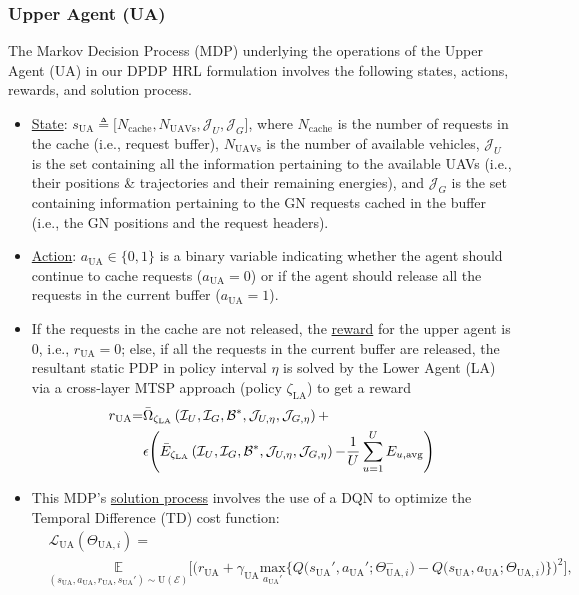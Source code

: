 \documentclass{article}
\begin{document}
\subsubsection{Upper Agent (UA)}
The Markov Decision Process (MDP) underlying the operations of the Upper Agent (UA) in our DPDP HRL formulation involves the following states, actions, rewards, and solution process.
\begin{itemize}
    \item \underline{State}: $s_{\mathrm{UA}}{\triangleq}\Big[N_{\mathrm{cache}},N_{\mathrm{UAVs}},\mathcal{J}_{U},\mathcal{J}_{G}\Big]$, where $N_{\mathrm{cache}}$ is the number of requests in the cache (i.e., request buffer), $N_{\mathrm{UAVs}}$ is the number of available vehicles, $\mathcal{J}_{U}$ is the set containing all the information pertaining to the available UAVs (i.e., their positions \& trajectories and their remaining energies), and $\mathcal{J}_{G}$ is the set containing information pertaining to the GN requests cached in the buffer (i.e., the GN positions and the request headers).
    \item \underline{Action}: $a_{\mathrm{UA}}{\in}\{0,1\}$ is a binary variable indicating whether the agent should continue to cache requests ($a_{\mathrm{UA}}{=}0$) or if the agent should release all the requests in the current buffer ($a_{\mathrm{UA}}{=}1$).
    \item If the requests in the cache are not released, the \underline{reward} for the upper agent is $0$, i.e., $r_{\mathrm{UA}}{=}0$; else, if all the requests in the current buffer are released, the resultant static PDP in policy interval $\eta$ is solved by the Lower Agent (LA) via a cross-layer MTSP approach (policy $\zeta_{\mathrm{LA}}$) to get a reward
    \begin{align}\label{Reward_lower_agent}
        r_{\mathrm{UA}}{=}&\Bar{\Omega}_{\zeta_{\mathrm{LA}}}\left(\mathcal{I}_{U},\mathcal{I}_{G},\mathcal{B}^{*},\mathcal{J}_{U,\eta},\mathcal{J}_{G,\eta}\right){+}\\&\epsilon\Bigg(\Bar{E}_{\zeta_{\mathrm{LA}}}\left(\mathcal{I}_{U},\mathcal{I}_{G},\mathcal{B}^{*},\mathcal{J}_{U,\eta},\mathcal{J}_{G,\eta}\right){-}\frac{1}{U}\sum_{u{=}1}^{U}E_{u,\mathrm{avg}}\Bigg)\nonumber
    \end{align}
    \item This MDP's \underline{solution process} involves the use of a DQN to optimize the Temporal Difference (TD) cost function:
    \begin{align}\label{TD_problem}
        &\mathcal{L}_{\mathrm{UA}}\left(\Theta_{\mathrm{UA},i}\right){=}\\&\underset{\left(s_{\mathrm{UA}},a_{\mathrm{UA}},r_{\mathrm{UA}},s_{\mathrm{UA}}'\right){\sim}\mathrm{U}(\mathcal{E})}{\mathbb{E}}\Bigg[\Bigg(r_{\mathrm{UA}}{+}\gamma_{\mathrm{UA}}\underset{a_{\mathrm{UA}}'}{\mathrm{max}}\Big\{Q\big(s_{\mathrm{UA}}',a_{\mathrm{UA}}';\Theta_{\mathrm{UA},i}^{-}\big){-}Q\big(s_{\mathrm{UA}},a_{\mathrm{UA}};\Theta_{\mathrm{UA},i}\big)\Big\}\Bigg)^{2}\Bigg],\nonumber

\end{align}
\end{itemize}
\end{document}
